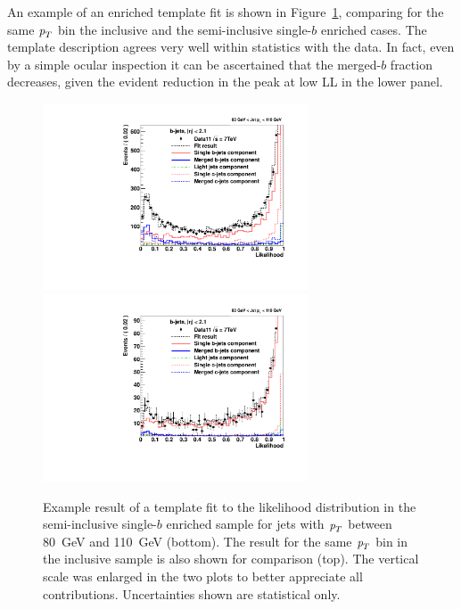 An example of an enriched template fit is shown in Figure~\ref{fig:fitenriched2btag1}, comparing for the same ${\emph{p}_{T}}$ bin the inclusive and the semi-inclusive single-$b$ enriched cases.  %
The template description agrees very well within statistics with the data. In fact, even by a simple ocular inspection it can be ascertained that the merged-$b$ fraction decreases, given the evident reduction in the peak at low LL in the lower panel. 
\begin{figure}[tp]
\centering
\includegraphics[width=0.7\textwidth]{FIGS/Fits/LikelihoodFit_3param_ETAFull_ZOOM_Bin2.pdf}
\includegraphics[width=0.7\textwidth]{FIGS/Fits/LikelihoodFit_3param_ETAFull_DataEnriched2btagZOOMtest_Bin2.pdf}
\caption{Example result of a template fit to the likelihood distribution in the semi-inclusive single-$b$ enriched sample for jets with ${\emph{p}_{T}}$ between  80~GeV and 110~GeV (bottom).  The result for the same  ${\emph{p}_{T}}$ bin in the inclusive sample is also shown for comparison (top).  The vertical scale was enlarged in the two plots to better appreciate all contributions. Uncertainties shown are statistical only.}
\label{fig:fitenriched2btag1}
\end{figure}

